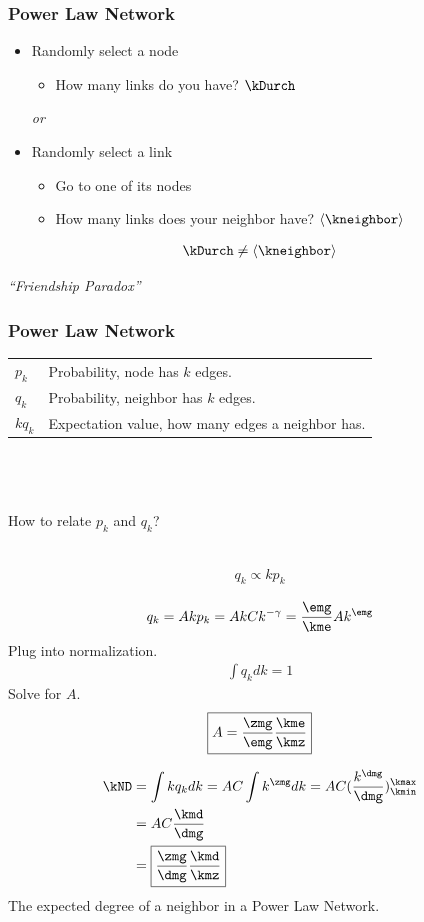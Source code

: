 \documentclass{beamer}
\newcommand{\gstar}[1]{\begin{align*}\displaystyle #1\end{align*}}
\begin{document}
\begin{frame}
\frametitle{Power Law Network}
\begin{itemize}
\item Randomly select a node
\begin{itemize}
\item How many links do you have? $\kDurch$
\end{itemize}
\begin{center}\textit{or}\end{center}
\item Randomly select a link 
\begin{itemize}
\item Go to one of its nodes
\item How many links does your neighbor have? $\langle \kneighbor \rangle$
\end{itemize}
\end{itemize}
\gstar{\kDurch \neq \langle \kneighbor \rangle}
\begin{center}\textit{``Friendship Paradox''}\end{center}
\end{frame}

\begin{frame}
\frametitle{Power Law Network}
\begin{center}
\begin{tabular}{l l}
$p_k$ & Probability, node has $k$ edges.\\
$q_k$ & Probability, neighbor has $k$ edges.\\
$k q_k$ & Expectation value, how many edges a neighbor has.\\
\end{tabular}
~\\~\\~\\How to relate $p_k$ and $q_k$?\\~\\
\end{center}
\gstar{q_k \propto kp_k}
\end{frame}

\begin{frame}
\gstar{q_k=Akp_k=AkCk^{-\gamma}= \br{\emg }{\kme} Ak^{\emg} }
Plug into normalization.
\gstar{\int q_k dk = 1}
Solve for $A$.
\gstar{\boxed{A=\br{\zmg}{\emg} \br{\kme}{\kmz}}}
\end{frame}

\begin{frame}
\gstar{\kND &= \int kq_k dk = AC \int k^{\zmg} dk = AC(\br{k^{\dmg}}{\dmg})_{\kmin}^{\kmax}\\
&= AC \br{\kmd}{\dmg} \\
&= \boxed{\br{\zmg}{\dmg} \br{\kmd}{\kmz} }}
The expected degree of a neighbor in a Power Law Network.
\end{frame}
\end{document}

